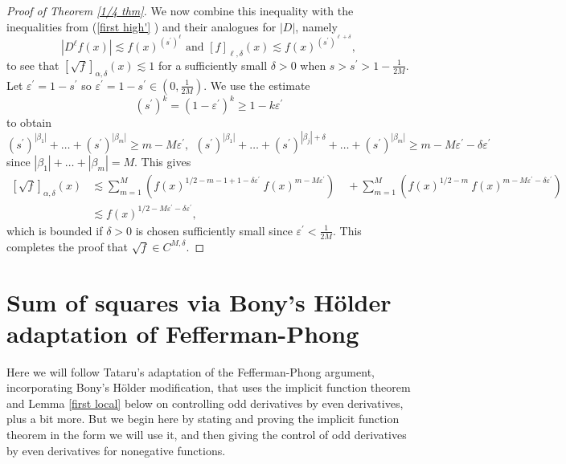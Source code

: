 \documentclass{amsart}
\theoremstyle{plain}
\numberwithin{equation}{section}
\begin{document}
\begin{proof}[Proof of Theorem \protect\ref{1/4 thm}]
We now combine this inequality with the inequalities from (\ref{first high'}%
) and their analogues for $\left\vert D\right\vert $, namely%
\begin{equation*}
\left\vert D^{\ell }f\left( x\right) \right\vert \lesssim f\left( x\right)
^{\left( s^{\prime }\right) ^{\ell }}\text{ and }\left[ f\right] _{\ell
,\delta }\left( x\right) \lesssim f\left( x\right) ^{\left( s^{\prime
}\right) ^{\ell +\delta }},
\end{equation*}%
to see that $\left[ \sqrt{f}\right] _{\alpha ,\delta }(x) \lesssim 1$ for a
sufficiently small $\delta >0$ when $s>s^{\prime }>1-\frac{1}{2M}$. Let $%
\varepsilon^{\prime}=1-s^{\prime}$ so $\varepsilon^{\prime}=1-s^{\prime
}\in\left(0,\frac{1}{2M}\right)$. We use the estimate 
\begin{equation*}
\left(s^{\prime}\right)^{k}=\left(1-\varepsilon^{\prime}\right)^{k}\geq
1-k\varepsilon^{\prime}
\end{equation*}
to obtain 
\begin{equation*}
\left( s^{\prime}\right) ^{|\beta_1| }+\dots+\left( s^{\prime}\right)
^{|\beta_m| }\geq m-M\varepsilon^{\prime},\ \ \left( s^{\prime}\right)
^{|\beta_1| }+\dots+\left( s^{\prime}\right) ^{|\beta_j|+\delta
}+\dots+\left( s^{\prime}\right) ^{|\beta_m| }\geq
m-M\varepsilon^{\prime}-\delta\varepsilon^{\prime}
\end{equation*}
since $|\beta _{1}|+\dots +|\beta_{m}|=M$. This gives 
\begin{align*}
\left[ \sqrt{f}\right] _{\alpha ,\delta }(x) &\lesssim \sum_{m=1}^{M}\left(
f(x)^{1/2-m-1+1-\delta\varepsilon^{\prime}}\
f(x)^{m-M\varepsilon^{\prime}}\right) \quad +\sum_{m=1}^{M}\left(
f(x)^{1/2-m} \
f(x)^{m-M\varepsilon^{\prime}-\delta\varepsilon^{\prime}}\right) \\
&\lesssim f(x)^{1/2-M\varepsilon^{\prime}-\delta\varepsilon^{\prime}},
\end{align*}%
which is bounded if $\delta >0$ is chosen sufficiently small since $%
\varepsilon ^{\prime }<\frac{1}{2M}$. This completes the proof that $\sqrt{f}%
\in C^{M,\delta }$.
\end{proof}

\section{Sum of squares via Bony's H\"{o}lder adaptation of Fefferman-Phong}

Here we will follow Tataru's adaptation of the Fefferman-Phong argument,
incorporating Bony's H\"{o}lder modification, that uses the implicit
function theorem and Lemma \ref{first local} below on controlling odd
derivatives by even derivatives, plus a bit more. But we begin here by
stating and proving the implicit function theorem in the form we will use
it, and then giving the control of odd derivatives by even derivatives for
nonegative functions.
\end{document}
